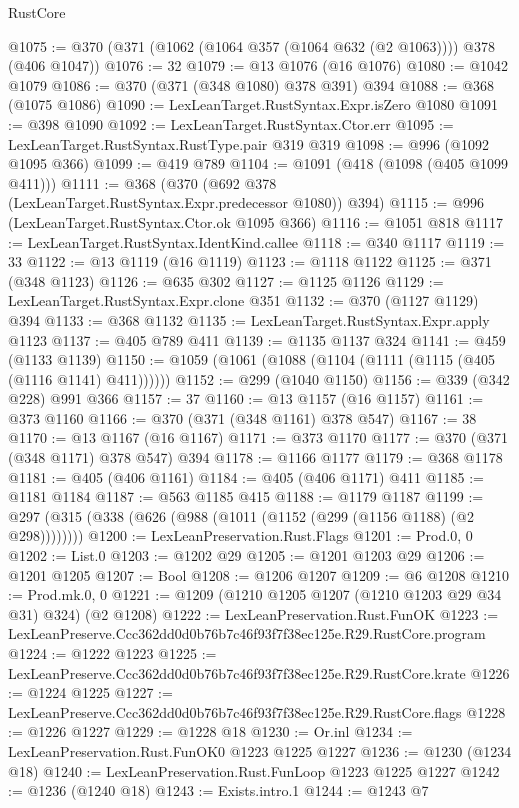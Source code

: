 \begin{lexlean}{RustCore}
\begin{coremodule}
@1075 := @370 (@371 (@1062 (@1064 @357 (@1064 @632 (@2 @1063)))) @378 (@406 @1047))
@1076 := 32
@1079 := @13 @1076 (@16 @1076)
@1080 := @1042 @1079
@1086 := @370 (@371 (@348 @1080) @378 @391) @394
@1088 := @368 (@1075 @1086)
@1090 := LexLeanTarget.RustSyntax.Expr.isZero @1080
@1091 := @398 @1090
@1092 := LexLeanTarget.RustSyntax.Ctor.err
@1095 := LexLeanTarget.RustSyntax.RustType.pair @319 @319
@1098 := @996 (@1092 @1095 @366)
@1099 := @419 @789
@1104 := @1091 (@418 (@1098 (@405 @1099 @411)))
@1111 := @368 (@370 (@692 @378 (LexLeanTarget.RustSyntax.Expr.predecessor @1080)) @394)
@1115 := @996 (LexLeanTarget.RustSyntax.Ctor.ok @1095 @366)
@1116 := @1051 @818
@1117 := LexLeanTarget.RustSyntax.IdentKind.callee
@1118 := @340 @1117
@1119 := 33
@1122 := @13 @1119 (@16 @1119)
@1123 := @1118 @1122
@1125 := @371 (@348 @1123)
@1126 := @635 @302
@1127 := @1125 @1126
@1129 := LexLeanTarget.RustSyntax.Expr.clone @351
@1132 := @370 (@1127 @1129) @394
@1133 := @368 @1132
@1135 := LexLeanTarget.RustSyntax.Expr.apply @1123
@1137 := @405 @789 @411
@1139 := @1135 @1137 @324
@1141 := @459 (@1133 @1139)
@1150 := @1059 (@1061 (@1088 (@1104 (@1111 (@1115 (@405 (@1116 @1141) @411))))))
@1152 := @299 (@1040 @1150)
@1156 := @339 (@342 @228) @991 @366
@1157 := 37
@1160 := @13 @1157 (@16 @1157)
@1161 := @373 @1160
@1166 := @370 (@371 (@348 @1161) @378 @547)
@1167 := 38
@1170 := @13 @1167 (@16 @1167)
@1171 := @373 @1170
@1177 := @370 (@371 (@348 @1171) @378 @547) @394
@1178 := @1166 @1177
@1179 := @368 @1178
@1181 := @405 (@406 @1161)
@1184 := @405 (@406 @1171) @411
@1185 := @1181 @1184
@1187 := @563 @1185 @415
@1188 := @1179 @1187
@1199 := @297 (@315 (@338 (@626 (@988 (@1011 (@1152 (@299 (@1156 @1188) (@2 @298))))))))
@1200 := LexLeanPreservation.Rust.Flags
@1201 := Prod.{0, 0}
@1202 := List.{0}
@1203 := @1202 @29
@1205 := @1201 @1203 @29
@1206 := @1201 @1205
@1207 := Bool
@1208 := @1206 @1207
@1209 := @6 @1208
@1210 := Prod.mk.{0, 0}
@1221 := @1209 (@1210 @1205 @1207 (@1210 @1203 @29 @34 @31) @324) (@2 @1208)
@1222 := LexLeanPreservation.Rust.FunOK
@1223 := LexLeanPreserve.Ccc362dd0d0b76b7c46f93f7f38ec125e.R29.RustCore.program
@1224 := @1222 @1223
@1225 := LexLeanPreserve.Ccc362dd0d0b76b7c46f93f7f38ec125e.R29.RustCore.krate
@1226 := @1224 @1225
@1227 := LexLeanPreserve.Ccc362dd0d0b76b7c46f93f7f38ec125e.R29.RustCore.flags
@1228 := @1226 @1227
@1229 := @1228 @18
@1230 := Or.inl
@1234 := LexLeanPreservation.Rust.FunOK0 @1223 @1225 @1227
@1236 := @1230 (@1234 @18)
@1240 := LexLeanPreservation.Rust.FunLoop @1223 @1225 @1227
@1242 := @1236 (@1240 @18)
@1243 := Exists.intro.{1}
@1244 := @1243 @7

\end{coremodule}
\end{lexlean}
